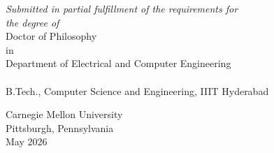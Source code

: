 
\begin{titlingpage}
\centering
{\huge\bfseries \thesisTitle\par}



\vfill
\emph{Submitted in partial fulfillment of the requirements for}\\
\emph{the degree of}\\

\vspace{1em}
Doctor of Philosophy\\
in\\
Department of Electrical and Computer Engineering\\

\vfill
{\thesisAuthor}\\
\vspace{1em}
B.Tech., Computer Science and Engineering, IIIT Hyderabad


\vfill
Carnegie Mellon University\\
Pittsburgh, Pennsylvania\\
\vspace{3em}
May 2026
\end{titlingpage}
\restoregeometry

